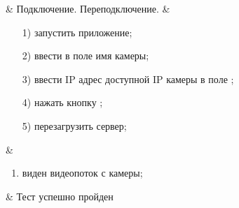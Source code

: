 \begin{longtable}
	 & Подключение. Переподключение. & 
   			\begin{enumerate}
				\item[1)] запустить приложение;
				\item[2)] ввести в поле \ipInput{} имя камеры;
				\item[3)] ввести IP адрес доступной IP камеры в поле \ipInput{};
				\item[4)] нажать кнопку \connectButton{};
				\item[5)] перезагрузить сервер;
			\end{enumerate}
   			& 
   			\begin{enumerate}
   				\item виден видеопоток с камеры;
   			\end{enumerate}
   			& Тест успешно пройден \\

   \hline
\end{longtable}

